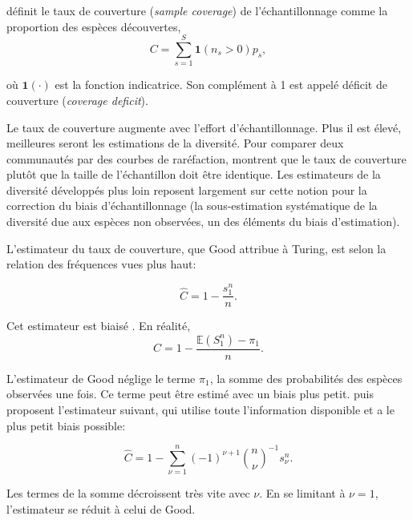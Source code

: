\documentclass[
  11pt,
  french,
  a4paper,
  extrafontsizes,onecolumn,openright
  ]{memoir}
\begin{document}
\textcite{Good1953} définit le taux de couverture (\emph{sample coverage}) de l'échantillonnage comme la proportion des espèces découvertes,
\begin{equation}
  \label{eq:C}
  C=\sum^S_{s=1}{{\mathbf 1}\left(n_s>0\right)p_s},
\end{equation}

où \({\mathbf 1}(\cdot)\) est la fonction indicatrice.
Son complément à 1 est appelé déficit de couverture (\emph{coverage deficit}).

Le taux de couverture augmente avec l'effort d'échantillonnage.
Plus il est élevé, meilleures seront les estimations de la diversité.
Pour comparer deux communautés par des courbes de raréfaction, \textcite{Chao2012b} montrent que le taux de couverture plutôt que la taille de l'échantillon doit être identique.
Les estimateurs de la diversité développés plus loin reposent largement sur cette notion pour la correction du biais d'échantillonnage \autocite{Dauby2012} (la sous-estimation systématique de la diversité due aux espèces non observées, un des éléments du biais d'estimation).

L'estimateur du taux de couverture, que Good attribue à Turing, est selon la relation des fréquences vues plus haut:

\begin{equation}
  \label{eq:CGood}
  \hat{C} = 1-\frac{s^{n}_{1}}{n}.
\end{equation}

Cet estimateur est biaisé \autocite{Zhang2007}. En réalité,
\begin{equation}
  \label{eq:CsansBiais}
  C = 1-\frac{{\mathbb E}(S^{n}_{1}) - \pi_1}{n}.
\end{equation}

L'estimateur de Good néglige le terme \(\pi_1\), la somme des probabilités des espèces observées une fois.
Ce terme peut être estimé avec un biais plus petit.
\textcite{Chao1988} puis \textcite{Zhang2007} proposent l'estimateur suivant, qui utilise toute l'information disponible et a le plus petit biais possible:

\begin{equation}
  \label{eq:CZhang}
  \hat{C}=1-\sum^{n}_{\nu=1}{\left(-1\right)}^{\nu+1}{\binom{n}{\nu}}^{-1}s^{n}_{\nu}.
\end{equation}

Les termes de la somme décroissent très vite avec \(\nu\).
En se limitant à \(\nu=1\), l'estimateur se réduit à celui de Good.
\end{document}
